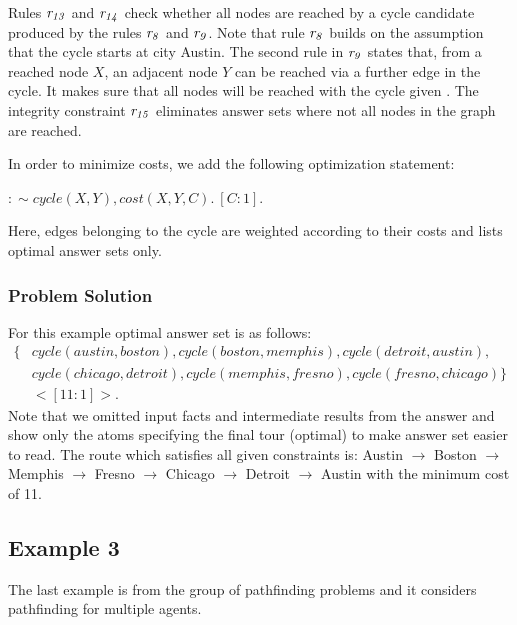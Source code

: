 \documentclass[a4paper, titlepage]{article}
\newcommand{\row}[1]{%
  \ensuremath{\it \color{black} #1 \color{black}}%
}
\begin{document}
Rules $\row{\row{r_{13}}}$ and $\row{r_{14}}$ check whether all 
nodes 
are reached by a cycle candidate produced by the rules 
$\row{r_8}$ and $\row{r_9}$.  Note that rule $\row{r_8}$ builds on the
assumption that the cycle starts at city Austin. The second 
rule in $\row{r_9}$ states that, from a reached node $X$, an 
adjacent node $Y$ can be reached via a further edge in the 
cycle. It makes sure that all nodes will be reached with the 
cycle given \cite{gkklorst2015}. The integrity constraint $\row{r_{15}}$ 
eliminates answer sets where not all nodes in the graph are reached.

In order to minimize costs, we add the following 
optimization statement: \\
\centerline{$:\sim cycle(X,Y), cost(X,Y,C). \  [C:1].$}
Here, edges belonging to the cycle are weighted according 
to their costs and \dlvhex{} lists optimal answer sets only.

\subsubsection{Problem Solution}
For this example optimal answer set 
is as follows:
\begin{align*}
\{&  cycle(austin,boston), 
cycle(boston,memphis),cycle(detroit,austin), \\
& cycle(chicago,detroit), 
cycle(memphis,fresno),cycle(fresno,chicago) \} \\
& <[11:1]>.
\end{align*}
Note that we omitted input facts and intermediate results from the answer and show only the atoms specifying the final tour (optimal) to make 
answer set easier to read. The route which satisfies all given constraints is: Austin $\rightarrow$ Boston $\rightarrow$ Memphis $\rightarrow$ Fresno $\rightarrow$ Chicago $\rightarrow$ Detroit $\rightarrow$ Austin with the minimum cost of 11. 




\subsection{Example 3}
\label{example3}
The last example is from the group of pathfinding problems and it considers pathfinding for multiple agents.
 
\end{document}
